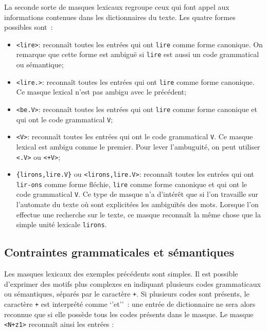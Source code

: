 La seconde sorte de masques lexicaux regroupe ceux qui font appel aux informations contenues
dans les dictionnaires du texte. Les quatre formes possibles sont~:


\bigskip
\begin{itemize}
\item \verb+<lire>+: reconnaît toutes les entrées qui ont \verb+lire+ comme forme canonique.
	On remarque que cette forme est ambiguë si \verb+lire+ est aussi un code grammatical ou
	sémantique;
  \item \verb+<lire.>+: reconnaît toutes les entrées qui ont \verb+lire+ comme forme canonique.
  	  Ce masque lexical n'est pas ambigu avec le précédent;
  \item \verb+<be.V>+: reconnaît toutes les entrées qui ont \verb+lire+ comme forme canonique
                       et qui ont le code grammatical  \verb+V+;
  \item \verb+<V>+: reconnaît toutes les entrées qui ont le code grammatical \verb+V+.
  	  Ce masque lexical est ambigu comme le premier. Pour lever l'ambuguité, on peut utiliser
  	  \verb+<.V>+ ou \verb$<+V>$;
\item \verb+{lirons,lire.V}+ ou \verb+<lirons,lire.V>+: reconnaît toutes les entrées qui ont
	\verb+lir-+\newline\verb+ons+ comme forme fléchie, \verb+lire+ comme forme canonique et qui
	ont le code grammatical
  \verb+V+. Ce type de masque n’a d’intérêt que si l’on travaille sur l’automate du texte où sont
  explicitées les ambiguïtés des mots.
   Lorsque l’on effectue une recherche sur
le texte, ce masque reconnaît la même chose que la simple unité lexicale \verb+lirons+.
\end{itemize}

\subsection{Contraintes grammaticales et sémantiques}

Les masques lexicaux des exemples précédents sont simples. Il est possible d’exprimer des
motifs plus complexes en indiquant plusieurs codes grammaticaux ou sémantiques, séparés
par le caractère \verb$+$. Si plusieurs codes sont présents, le caractère \verb$+$ est interprété
comme `'et''~: une entrée de dictionnaire ne sera alors reconnue que si elle 
possède tous les codes présents dans le masque.
 Le masque \verb$<N+z1>$ reconnaît ainsi les entrées :

